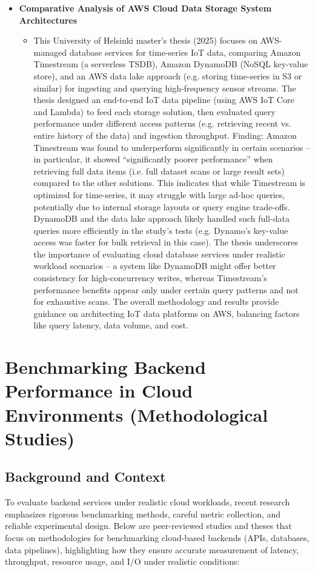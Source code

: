 \documentclass[11pt]{article}
\begin{document}
\begin{itemize}
\begin{itemize}
    \end{itemize}
    \item[] \textbf{Comparative Analysis of AWS Cloud Data Storage System Architectures} 
    \begin{itemize}
        \item[]  This University of Helsinki master’s thesis (2025) focuses on AWS-managed database services for time-series IoT data, comparing Amazon Timestream (a serverless TSDB), Amazon DynamoDB (NoSQL key-value store), and an AWS data lake approach (e.g. storing time-series in S3 or similar) for ingesting and querying high-frequency sensor streams. The thesis designed an end-to-end IoT data pipeline (using AWS IoT Core and Lambda) to feed each storage solution, then evaluated query performance under different access patterns (e.g. retrieving recent vs. entire history of the data) and ingestion throughput. Finding: Amazon Timestream was found to underperform significantly in certain scenarios – in particular, it showed “significantly poorer performance” when retrieving full data items (i.e. full dataset scans or large result sets) compared to the other solutions. This indicates that while Timestream is optimized for time-series, it may struggle with large ad-hoc queries, potentially due to internal storage layouts or query engine trade-offs. DynamoDB and the data lake approach likely handled such full-data queries more efficiently in the study’s tests (e.g. Dynamo’s key-value access was faster for bulk retrieval in this case). The thesis underscores the importance of evaluating cloud database services under realistic workload scenarios – a system like DynamoDB might offer better consistency for high-concurrency writes, whereas Timestream’s performance benefits appear only under certain query patterns and not for exhaustive scans. The overall methodology and results provide guidance on architecting IoT data platforms on AWS, balancing factors like query latency, data volume, and cost.
    \end{itemize}
\end{itemize}

\newpage
\section*{Benchmarking Backend Performance in Cloud Environments (Methodological Studies)}

\subsection*{Background and Context}
To evaluate backend services under realistic cloud workloads, recent research emphasizes rigorous benchmarking methods, careful metric collection, and reliable experimental design. Below are peer-reviewed studies and theses that focus on methodologies for benchmarking cloud-based backends (APIs, databases, data pipelines), highlighting how they ensure accurate measurement of latency, throughput, resource usage, and I/O under realistic conditions:
\end{document}
